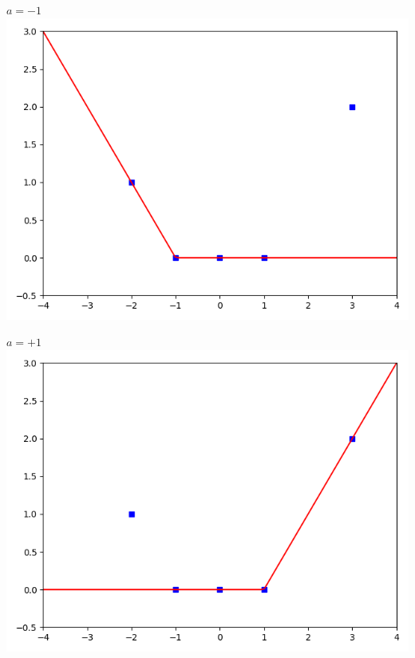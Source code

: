 \documentclass[11pt,class=report,crop=false]{standalone}
\begin{document}
\begin{center}
\begin{minipage}{0.45\textwidth}
\center \textbf{$a=-1$}
\includegraphics[scale=\myscale,scale=0.45]{figures/retro_04_b}
\end{minipage}
\begin{minipage}{0.45\textwidth}
\center \textbf{$a=+1$}
\includegraphics[scale=\myscale,scale=0.45]{figures/retro_04_c}
\end{minipage}
\end{center}
\end{document}
